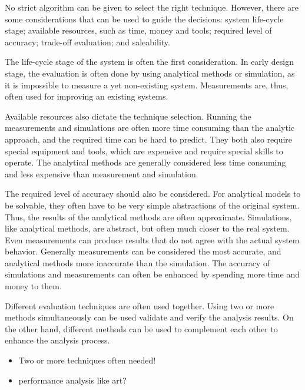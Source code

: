 No strict algorithm   can be given to select the right technique. However, there are some considerations that can be used to guide the decisions: system life-cycle stage; available resources, such as time, money and tools; required level of accuracy; trade-off evaluation; and saleability. \cite{jain:1991:AOCSPA}

The life-cycle stage of the system is often the first consideration. In early design stage, the evaluation is often done by using analytical methods or simulation, as it is impossible to measure a yet non-existing system. Measurements are, thus, often used for improving an existing systems. \cite{jain:1991:AOCSPA}

Available resources also dictate the technique selection. Running the measurements and simulations are often more time consuming \cite{Fujimoto:1990:PDE} than the analytic approach, and the required time can be hard to predict. They both also require special equipment and tools, which are expensive and require special skills to operate. The analytical methods are generally considered less time consuming and less expensive than measurement and simulation.  \cite{jain:1991:AOCSPA}

The required level of accuracy should also be considered. For analytical models to be solvable, they often have to be very simple abstractions of the original system. Thus, the results of the analytical methods are often approximate. Simulations, like analytical methods, are abstract, but often much closer to the real system. Even measurements can produce results that do not agree with the actual system behavior. Generally measurements can be considered the most accurate, and analytical methods more inaccurate than the simulation. The accuracy of simulations and measurements can often be enhanced by spending more time and money to them. \cite{jain:1991:AOCSPA}

Different evaluation techniques are often used together. Using two or more methods simultaneously can be used validate and verify the analysis results. On the other hand, different methods can be used to complement each other to enhance the analysis process. \cite{jain:1991:AOCSPA}

\begin{itemize}
\item Two or more techniques often needed!
\item performance analysis like art?
\end{itemize}

